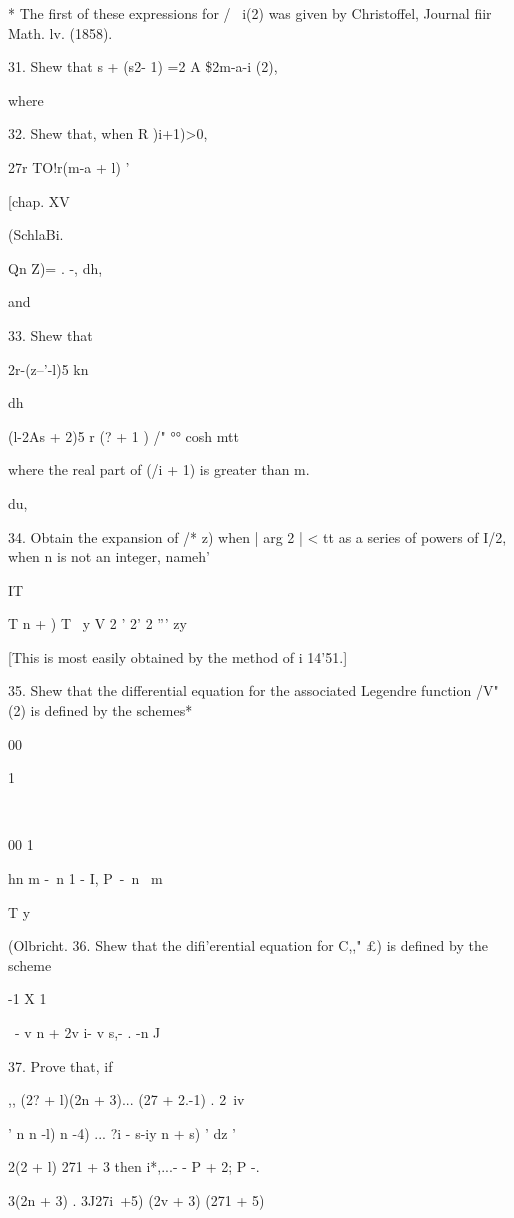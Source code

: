 {{{{* The first of these expressions for / \ i(2) was given by
Christoffel, Journal fiir Math. lv. (1858).

%
%

31. Shew that s + (s2- 1) =2 A \$2m-a-i (2),

where

32. Shew that, when R )i+1)>0,

27r TO!r(m-a + l) '

[chap. XV

(SchlaBi.

Qn Z)= . -, dh,

and

33. Shew that


 2r-(z--'-l)5 kn

dh

(l-2As + 2)5 r (? + 1 ) /" °° cosh mtt

where the real part of (/i + 1) is greater than m.

du,


34. Obtain the expansion of /* z) when | arg 2 | < tt as a series of
powers of I/2, when n is not an integer, nameh'

IT

T n + ) T \ y V 2 ' 2' 2 ''' zy

[This is most easily obtained by the method of i 14'51.]

35. Shew that the differential equation for the associated Legendre
function /V" (2) is defined by the schemes*

00

1

\

00 1

hn m -\ n 1 - I, P\ -\ n \ m ~

T y

(Olbricht. 36. Shew that the difi'erential equation for C,," £) is
defined by the scheme

 -1 X 1 \

\ - v n + 2v i- v s,- . -n J

37. Prove that, if

,, (2? + l)(2n + 3)... (27 + 2.-1) . 2\ iv

 ' n n -l) n -4) ... ?i - s-iy n + s) ' dz '

2(2 + l) 271 + 3 then i*,...- - P + 2; P -.

3(2n + 3) . 3J27i\ +5) (2v + 3) (271 + 5)

}}}}
